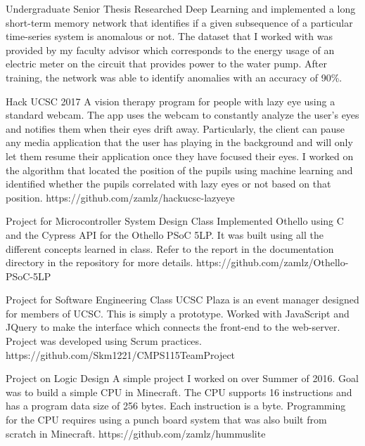 \documentclass{cv}
\begin{document}
\begin{adjustwidth}{0.5cm}{0.5cm}
{Undergraduate Senior Thesis}
{Researched Deep Learning and implemented a long short-term memory
network that identifies if a given subsequence of a particular
time-series system is anomalous or not. The dataset that I worked with
was provided by my faculty advisor which corresponds to the energy usage
of an electric meter on the circuit that provides power to the water
pump. After training, the network was able to identify anomalies with
an accuracy of 90\%.}{}

{Hack UCSC 2017}
{A vision therapy program for people with lazy eye using a standard
webcam. The app uses the webcam to constantly analyze the user's eyes
and notifies them when their eyes drift away. Particularly, the client
can pause any media application that the user has playing in the
background and will only let them resume their application once they
have focused their eyes. I worked on the algorithm that located the
position of the pupils using machine learning and identified whether
the pupils correlated with lazy eyes or not based on that position.}
{https://github.com/zamlz/hackucsc-lazyeye}

{Project for Microcontroller System Design Class}
{Implemented Othello using C and the Cypress API for the Othello PSoC 5LP.
It was built using all the different concepts learned in class. Refer to the
report in the documentation directory in the repository for more details.}
{https://github.com/zamlz/Othello-PSoC-5LP}

{Project for Software Engineering Class}
{UCSC Plaza is an event manager designed for members of UCSC. This is simply
a prototype. Worked with JavaScript and JQuery to make the interface which
connects the front-end to the web-server. Project was developed using Scrum
practices.}
{https://github.com/Skm1221/CMPS115TeamProject}

{Project on Logic Design}
{A simple project I worked on over Summer of 2016. Goal was to build a simple
CPU in Minecraft. The CPU supports 16 instructions and has a program data
size of 256 bytes. Each instruction is a byte. Programming for the CPU
requires using a punch board system that was also built from scratch in
Minecraft.}
{https://github.com/zamlz/hummuslite}
\end{adjustwidth}
\end{document}
